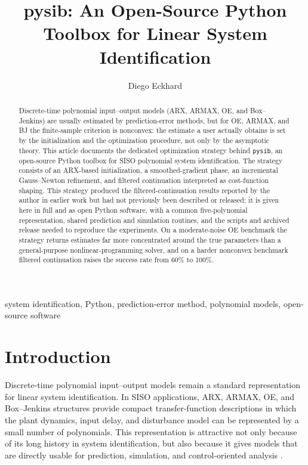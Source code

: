 \documentclass{ifacconf}
\begin{document}
\begin{frontmatter}

\title{pysib: An Open-Source Python Toolbox for Linear System Identification}

\author[ufrgs]{Diego Eckhard}
\address[ufrgs]{Universidade Federal do Rio Grande do Sul, Porto Alegre, Brazil
  (e-mail: diegoeck@ufrgs.br)}

\begin{abstract}
Discrete-time polynomial input--output models (ARX, ARMAX, OE, and
Box--Jenkins) are usually estimated by prediction-error methods, but for OE,
ARMAX, and BJ the finite-sample criterion is nonconvex: the estimate a user
actually obtains is set by the initialization and the optimization procedure,
not only by the asymptotic theory.  This article documents the dedicated
optimization strategy behind \texttt{pysib}, an open-source Python toolbox for
SISO polynomial system identification.  The strategy consists of an ARX-based
initialization, a smoothed-gradient phase, an incremental Gauss--Newton
refinement, and filtered continuation interpreted as cost-function shaping.  This
strategy produced the
filtered-continuation results reported by the author in earlier work but had not
previously been described or released; it is given here in full and as open
Python software, with a common five-polynomial representation, shared prediction
and simulation routines, and the scripts and archived release needed to
reproduce the experiments.  On a moderate-noise OE benchmark the strategy returns
estimates far more concentrated around the true parameters than a
general-purpose nonlinear-programming solver, and on a harder nonconvex benchmark
filtered continuation raises the success rate from 60\% to 100\%.
\end{abstract}

\begin{keyword}
system identification, Python, prediction-error method, polynomial models,
open-source software
\end{keyword}

\end{frontmatter}

\section{Introduction}
\label{sec:introduction}

Discrete-time polynomial input--output models remain a standard representation
for linear system identification.  In SISO applications, ARX, ARMAX, OE, and
Box--Jenkins structures provide compact transfer-function descriptions in which
the plant dynamics, input delay, and disturbance model can be represented by a
small number of polynomials.  This representation is attractive not only because
of its long history in system identification, but also because it gives models
that are directly usable for prediction, simulation, and control-oriented
analysis \citep{ljung2010}.
\end{document}
